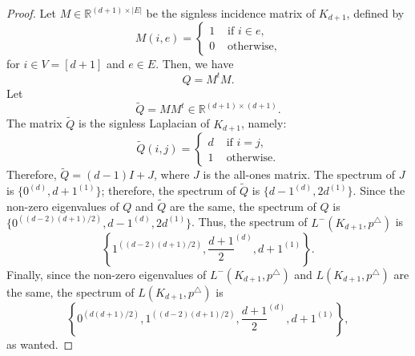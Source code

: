 \documentclass[a4paper,11pt]{article}
\theoremstyle{plain}
\theoremstyle{definition}
\newcommand{\Rea}{{\mathbb R}}
\begin{document}
\begin{proof}
Let $M\in \Rea^{(d+1)\times|E|}$ be the signless incidence matrix of $K_{d+1}$, defined by
\[
    M(i,e)=\begin{cases}
                    1 & \text{ if } i\in e,\\
                    0 & \text{ otherwise,}
                    \end{cases} 
\]
for $i\in V=[d+1]$ and $e\in E$. Then, we have
\[
    Q= M^{t} M.
\]
Let
\[
    \tilde{Q}= M M^{t}\in \Rea^{(d+1)\times(d+1)}.
\]
The matrix $\tilde{Q}$ is the signless Laplacian of $K_{d+1}$, namely:
\[
    \tilde{Q}(i,j)=\begin{cases}
                    d & \text{ if } i=j,\\
                    1 & \text{ otherwise.}
                    \end{cases} 
\]
Therefore, $\tilde{Q}=(d-1)I+J$, where $J$ is the all-ones matrix. The spectrum of $J$ is $\{0^{(d)},d+1^{(1)}\}$; therefore, the spectrum of $\tilde{Q}$ is $\{d-1^{(d)},2d^{(1)}\}$. Since the non-zero eigenvalues of $Q$ and $\tilde{Q}$ are the same, the spectrum of $Q$ is $\{0^{((d-2)(d+1)/2)},d-1^{(d)},2d^{(1)}\}$.
Thus, the spectrum of $L^{-}(K_{d+1},p^{\triangle})$ is 
\[
\left\{1^{((d-2)(d+1)/2)},\frac{d+1}{2}^{(d)},d+1^{(1)}\right\}.
\]
Finally, since the non-zero eigenvalues of $L^{-}(K_{d+1},p^{\triangle})$ and $L(K_{d+1},p^{\triangle})$ are the same, the spectrum of $L(K_{d+1},p^{\triangle})$ is
\[
\left\{0^{(d(d+1)/2)},1^{((d-2)(d+1)/2)},\frac{d+1}{2}^{(d)},d+1^{(1)}\right\},
\]
as wanted.
\end{proof}
\end{document}

